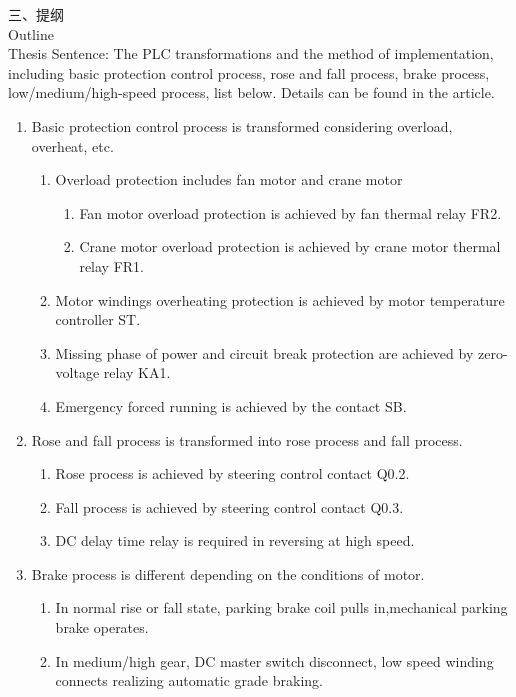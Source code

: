 \documentclass[a4paper]{article}
\renewcommand{\Large}{\fontsize{12pt}{\baselineskip}\selectfont}
\begin{document}
{ \Large 三、提纲} \\
{ \Large Outline} \\
Thesis Sentence: The PLC transformations and the method of implementation, including basic protection control process, rose and fall process, brake process, low/medium/high-speed process, list below. Details can be found in the article.
\begin{enumerate}
\item Basic protection control process is transformed considering overload, overheat, etc.
	\begin{enumerate}
\item Overload protection includes fan motor and crane motor
		\begin{enumerate}
\item Fan motor overload protection is achieved  by fan thermal relay FR2.
\item Crane motor overload protection is achieved  by crane motor thermal relay FR1.
		\end{enumerate}
\item Motor windings overheating protection is achieved by  motor temperature controller ST.
\item Missing phase of power and circuit break protection are achieved by  zero-voltage relay KA1.
\item Emergency forced running is achieved by the contact SB.
	\end{enumerate}
\item Rose and fall process is transformed into rose process and fall process.
	\begin{enumerate}
\item Rose process  is achieved by steering control contact Q0.2.
\item Fall process is  achieved by steering control contact Q0.3.
\item DC delay time relay is required in reversing at high speed.
	\end{enumerate}
\item Brake process is different depending on the conditions of motor.
	\begin{enumerate} 
\item In normal rise or fall state, parking brake   coil pulls in,mechanical parking brake operates.
\item In medium/high gear, DC master switch disconnect, low speed winding connects realizing automatic grade braking.
	\end{enumerate} 

\end{enumerate}
\end{document}
